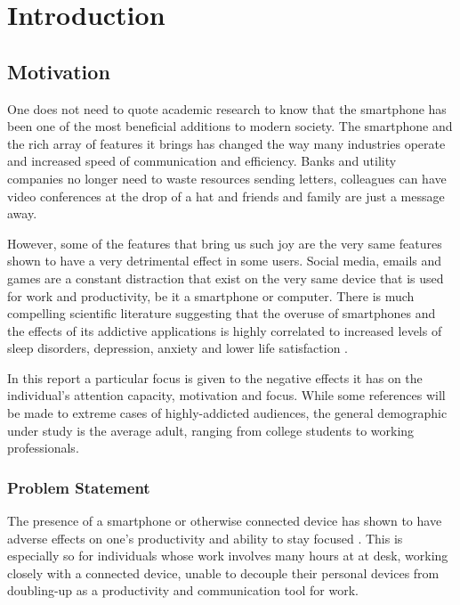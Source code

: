 \chapter{Introduction}

\section{Motivation}
One does not need to quote academic research to know that the smartphone has been one of the most beneficial additions to modern society. The smartphone and the rich array of features it brings has changed the way many industries operate and increased speed of communication and efficiency. Banks and utility companies no longer need to waste resources sending letters, colleagues can have video conferences at the drop of a hat and friends and family are just a message away.

However, some of the features that bring us such joy are the very same features shown to have a very detrimental effect in some users. Social media, emails and games are a constant distraction that exist on the very same device that is used for work and productivity, be it a smartphone or computer. There is much compelling scientific literature suggesting that the overuse of smartphones and the effects of its addictive applications is highly correlated to increased levels of sleep disorders, depression, anxiety and lower life satisfaction \cite{abi2020smartphones, lee2014hooked, demirci2015relationship}.

In this report a particular focus is given to the negative effects it has on the individual's attention capacity, motivation and focus. While some references will be made to extreme cases of highly-addicted audiences, the general demographic under study is the average adult, ranging from college students to working professionals.

\subsection{Problem Statement}
The presence of a smartphone or otherwise connected device has shown to have adverse effects on one's productivity and ability to stay focused \cite{thornton2014mere}. This is especially so for individuals whose work involves many hours at at desk, working closely with a connected device, unable to decouple their personal devices from doubling-up as a productivity and communication tool for work.


